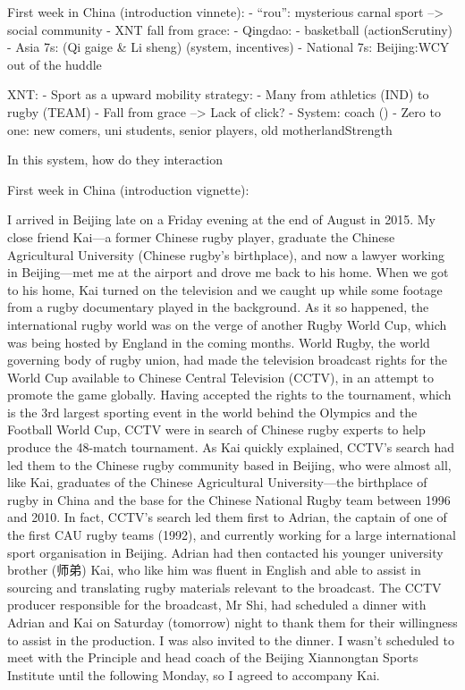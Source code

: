 First week in China (introduction vinnete):
- ``rou'': mysterious carnal sport --> social community
- XNT fall from grace:
- Qingdao:
    - basketball (actionScrutiny)
    - Asia 7s: (Qi gaige & Li sheng) (system, incentives)
    - National 7s: Beijing:WCY out of the huddle


XNT:
- Sport as a upward mobility strategy:
    - Many from athletics (IND) to rugby (TEAM)
- Fall from grace --> Lack of click?
- System: coach ()
- Zero to one: new comers, uni students, senior players, old motherlandStrength

In this system, how do they interaction




First week in China (introduction vignette):

I arrived in Beijing late on a Friday evening at the end of August in 2015.  My close friend Kai---a former Chinese rugby player, graduate the Chinese Agricultural University (Chinese rugby's birthplace), and now a lawyer working in Beijing---met me at the airport and drove me back to his home.  When we got to his home, Kai turned on the television and we caught up while some footage from a rugby documentary played in the background.  As it so happened, the international rugby world was on the verge of another Rugby World Cup, which was being hosted by England in the coming months. World Rugby, the world governing body of rugby union, had made the television broadcast rights for the World Cup available to Chinese Central Television (CCTV), in an attempt to promote the game globally.  Having accepted the rights to the tournament, which is the 3rd largest sporting event in the world behind the Olympics and the Football World Cup, CCTV were in search of Chinese rugby experts to help produce the 48-match tournament.  As Kai quickly explained, CCTV's search had led them to the Chinese rugby community based in Beijing, who were almost all, like Kai, graduates of the Chinese Agricultural University---the birthplace of rugby in China and the base for the Chinese National Rugby team between 1996 and 2010.  In fact, CCTV's search led them first to Adrian, the captain of one of the first CAU rugby teams (1992), and currently working for a large international sport organisation in Beijing.  Adrian had then contacted his younger university brother (师弟) Kai, who like him was fluent in English and able to assist in sourcing and translating rugby materials relevant to the broadcast. The CCTV producer responsible for the broadcast, Mr Shi, had scheduled a dinner with Adrian and Kai on Saturday (tomorrow) night to thank them for their willingness to assist in the production.  I was also invited to the dinner. I wasn't scheduled to meet with the Principle and head coach of the Beijing Xiannongtan Sports Institute until the following Monday, so I agreed to accompany Kai.

